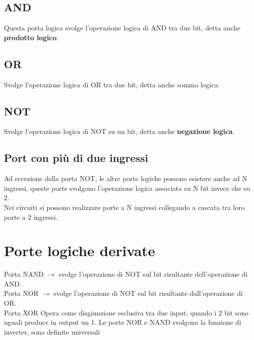 \documentclass[12pt, a4paper, openany]{book}
\begin{document}
\subsection{AND}
Questa porta logica svolge l'operazione logica di AND tra due bit, detta anche \textbf{prodotto logico}.

\subsection{OR}
Svolge l'operazione logica di OR tra due bit, detta anche somma logica.

\subsection{NOT}
Svolge l'operazione logica di NOT su un bit, detta anche \textbf{negazione logica}.

\subsection{Port con più di due ingressi}
Ad eccezione della porta NOT, le altre porte logiche possono esistere anche ad N ingressi, queste porte
svolgono l'operazione logica associata su N bit invece che su 2.
\\ Nei circuiti si possono realizzare porte a N ingressi collegando a cascata tra loro porte a 2 ingressi.

\section{Porte logiche derivate}
Porta NAND $\to$ svolge l'operazione di NOT sul bit risultante dell'operazione di AND.
\\ Porta NOR $ \to $ svolge l'operazione di NOT sul bit risultante dall'operazione di OR.
\\ Porta XOR Opera come disgiunzione esclusiva tra due input, quando i 2 bit sono uguali produce in output un 1. 
Le porte NOR e NAND svolgono la funzione di inverter, sono definite universali
\end{document}
